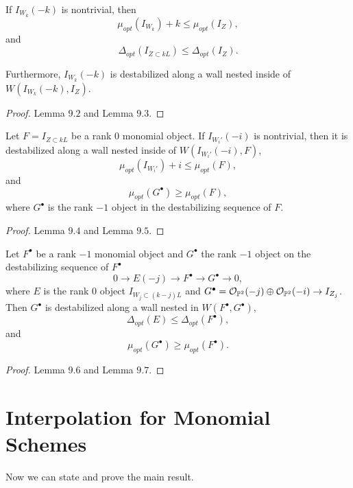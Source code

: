 \documentclass[
	oldfontcommands,
	sumario=abnt-6027-2012,
	12pt,			%
	openright,		%
	oneside,		%
	a4paper,		%
	english,		%
	brazil			%
	]{imecc-unicamp}
\begin{document}
\begin{lema}
	If $I_{W_k}(-k)$ is nontrivial, then $$
	\mu_{opt}(I_{W_k})+k \le  \mu_{opt}(I_Z),
	$$
	and $$
	\Delta_{opt}(I_{Z\subset kL})\le \Delta_{opt}(I_Z).
	$$
	
	Furthermore, $I_{W_k}(-k)$ is destabilized along a wall nested inside of $W(I_{W_k}(-k),I_Z)$.
\end{lema}
\begin{proof}
	\cite{COSKUN} Lemma $9.2$ and Lemma $9.3$.
\end{proof}
\begin{lema}
	Let $F=I_{Z\subset kL}$ be a rank $0$ monomial object. If $I_{W_i'}(-i)$ is nontrivial, then it is destabilized along a wall nested inside of $W(I_{W_i'}(-i),F)$, $$
	\mu_{opt}(I_{W_i'})+i\le\mu_{opt}(F),
	$$
	and
	$$
	\mu_{opt}(G^\bullet)\geq\mu_{opt}(F),
	$$
	where $G^\bullet$ is the rank $-1$ object in the destabilizing sequence of $F$.
\end{lema}
\begin{proof}
	\cite{COSKUN} Lemma $9.4$ and Lemma $9.5$.
\end{proof}
\begin{lema}
	Let $F^\bullet$ be a rank $-1$ monomial object and $G^\bullet$ the rank $-1$ object on the destabilizing sequence of $F^\bullet$ $$ 0\rightarrow E(-j)\rightarrow F^\bullet\rightarrow G^\bullet\rightarrow 0,$$ where $E$ is the rank $0$ object $I_{W_j\subset (k-j)L}$ and $G^\bullet={\mathcal O}_{{\mathbb P}^2}(-j)\oplus{\mathcal O}_{{\mathbb P}^2}(-i)\rightarrow I_{Z_j}$. Then $G^\bullet$ is destabilized along a wall nested in $W(F^\bullet, G^\bullet)$,    $$
	\Delta_{opt}(E)\le \Delta_{opt}(F^\bullet),
	$$
	and $$
	\mu_{opt}(G^\bullet)\geq \mu_{opt}(F^\bullet).
	$$
\end{lema}
\begin{proof}
	\cite{COSKUN} Lemma $9.6$ and Lemma $9.7$.
\end{proof}
\section{Interpolation for Monomial Schemes}

Now we can state and prove the main result.
\end{document}
